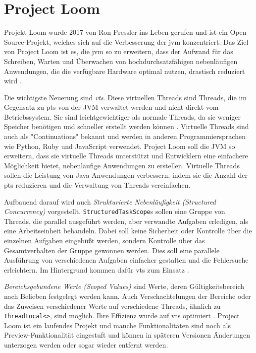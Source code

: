 \chapter{Project Loom}
\label{cha:ProjectLoom}

    Projekt Loom wurde 2017 von Ron Pressler ins Leben gerufen und ist ein Open-Source-Projekt, 
    welches sich auf die Verbesserung der \gls{jvm} konzentriert. Das Ziel von Project Loom ist es, 
    die \gls{jvm} so zu erweitern, dass der Aufwand für das Schreiben, Warten und Überwachen von hochdurchsatzfähigen nebenläufigen Anwendungen,
    die die verfügbare Hardware optimal nutzen, drastisch reduziert wird \cite{ProjectLoom}.

    Die wichtigste Neuerung sind \emph{\Glspl{vt}}.
    Diese virtuellen Threads sind Threads, die im Gegensatz zu \Glspl{pt} von der JVM verwaltet werden und nicht direkt vom Betriebssystem. 
    Sie sind leichtgewichtiger als normale Threads, da sie weniger Speicher benötigen und schneller erstellt werden können \cite{JEP444}.
    Virtuelle Threads sind auch als "Continuations" bekannt und werden in anderen Programmiersprachen wie Python, Ruby und JavaScript verwendet.
    Project Loom soll die JVM so erweitern, dass sie virtuelle Threads unterstützt und Entwicklern eine einfachere Möglichkeit bietet,
    nebenläufige Anwendungen zu erstellen. Virtuelle Threads sollen die Leistung von Java-Anwendungen verbessern, indem sie die Anzahl der \Glspl{pt} reduzieren und 
    die Verwaltung von Threads vereinfachen. 

    Aufbauend darauf wird auch \emph{Strukturierte Nebenläufigkeit (Structured Concurrency)} vorgestellt.
    \texttt{StructuredTaskScope}s sollen eine Gruppe von Threads, die parallel ausgeführt werden, aber verwandte Aufgaben erledigen, als eine Arbeitseinheit behandeln. 
    Dabei soll keine Sicherheit oder Kontrolle über die einzelnen Aufgaben eingebüßt werden, sondern Kontrolle über das Gesamtverhalten der Gruppe gewonnen werden.
    Dies soll eine parallele Ausführung von verschiedenen Aufgaben einfacher gestalten und die Fehlersuche erleichtern.
    Im Hintergrund kommen dafür \Glspl{vt} zum Einsatz \cite{JEP453}.

    \emph{Bereichsgebundene Werte (Scoped Values)} sind Werte, deren Gültigkeitsbereich nach Belieben festgelegt werden kann.
    Auch Verschachtelungen der Bereiche oder das
    Zuweisen verschiedener Werte auf verschiedene Threads, ähnlich zu \texttt{ThreadLocal<>}, sind möglich. Ihre Effizienz wurde auf \Glspl{vt} optimiert
    \cite{JEP481}.
    Project Loom ist ein laufendes Projekt und manche Funktionalitäten sind noch als Preview-Funktionalität eingestuft und können in späteren Versionen Änderungen 
    unterzogen werden oder sogar wieder entfernt werden.



